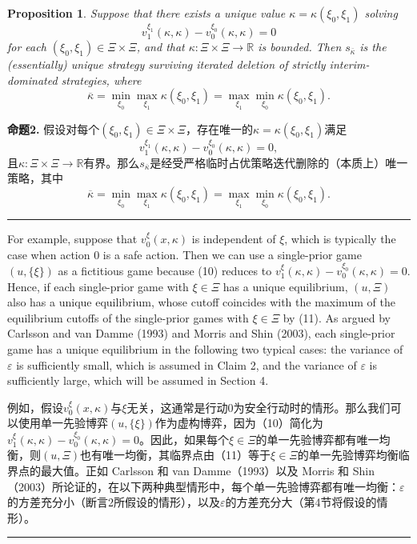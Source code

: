 \documentclass[12pt,a4paper]{article}
\newenvironment{original}
  {\par\medskip\noindent\color{black}\ignorespaces}
  {\par\medskip}
\newenvironment{translation}
  {\par\noindent\color{darkblue}\ignorespaces}
  {\par\medskip\noindent\hrule\par\medskip}
\newtheorem{proposition}[theorem]{Proposition}
\theoremstyle{definition}
\theoremstyle{remark}
\begin{document}
\begin{proposition}
Suppose that there exists a unique value $\kappa = \kappa(\xi_0, \xi_1)$ solving
\[
v_1^{\xi_1}(\kappa, \kappa) - v_0^{\xi_0}(\kappa, \kappa) = 0
\tag{10}
\]
for each $(\xi_0, \xi_1) \in \Xi \times \Xi$, and that $\kappa \colon \Xi \times \Xi \to \mathbb{R}$ is bounded. Then $s_{\overline{\kappa}}$ is the (essentially) unique strategy surviving iterated deletion of strictly interim-dominated strategies, where
\[
\overline{\kappa} = \min_{\xi_0} \max_{\xi_1} \kappa(\xi_0, \xi_1) = \max_{\xi_1} \min_{\xi_0} \kappa(\xi_0, \xi_1).
\tag{11}
\]
\end{proposition}
\begin{translation}
\color{darkblue}\textbf{命题2.} 假设对每个$(\xi_0, \xi_1) \in \Xi \times \Xi$，存在唯一的$\kappa = \kappa(\xi_0, \xi_1)$满足
\[
v_1^{\xi_1}(\kappa, \kappa) - v_0^{\xi_0}(\kappa, \kappa) = 0,
\tag{10}
\]
且$\kappa \colon \Xi \times \Xi \to \mathbb{R}$有界。那么$s_{\overline{\kappa}}$是经受严格临时占优策略迭代删除的（本质上）唯一策略，其中
\[
\overline{\kappa} = \min_{\xi_0} \max_{\xi_1} \kappa(\xi_0, \xi_1) = \max_{\xi_1} \min_{\xi_0} \kappa(\xi_0, \xi_1).
\tag{11}
\]
\end{translation}

\begin{original}
For example, suppose that $v_0^\xi(x, \kappa)$ is independent of $\xi$, which is typically the case when action 0 is a safe action. Then we can use a single-prior game $(u, \{\xi\})$ as a fictitious game because (10) reduces to $v_1^\xi(\kappa, \kappa) - v_0^{\xi_0}(\kappa, \kappa) = 0$. Hence, if each single-prior game with $\xi \in \Xi$ has a unique equilibrium, $(u, \Xi)$ also has a unique equilibrium, whose cutoff coincides with the maximum of the equilibrium cutoffs of the single-prior games with $\xi \in \Xi$ by (11). As argued by Carlsson and van Damme (1993) and Morris and Shin (2003), each single-prior game has a unique equilibrium in the following two typical cases: the variance of $\varepsilon$ is sufficiently small, which is assumed in Claim 2, and the variance of $\varepsilon$ is sufficiently large, which will be assumed in Section 4.
\end{original}
\begin{translation}
例如，假设$v_0^\xi(x, \kappa)$与$\xi$无关，这通常是行动0为安全行动时的情形。那么我们可以使用单一先验博弈$(u, \{\xi\})$作为虚构博弈，因为（10）简化为$v_1^\xi(\kappa, \kappa) - v_0^{\xi_0}(\kappa, \kappa) = 0$。因此，如果每个$\xi \in \Xi$的单一先验博弈都有唯一均衡，则$(u, \Xi)$也有唯一均衡，其临界点由（11）等于$\xi \in \Xi$的单一先验博弈均衡临界点的最大值。正如 Carlsson 和 van Damme（1993）以及 Morris 和 Shin（2003）所论证的，在以下两种典型情形中，每个单一先验博弈都有唯一均衡：$\varepsilon$的方差充分小（断言2所假设的情形），以及$\varepsilon$的方差充分大（第4节将假设的情形）。
\end{translation}
\end{document}
